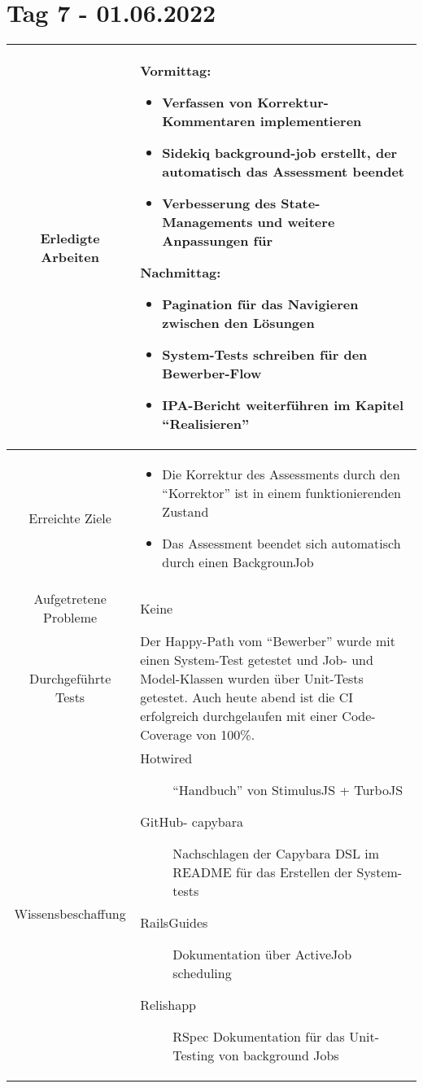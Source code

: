 \section{Tag 7 - 01.06.2022}

\begin{tabularx}{\textwidth}[H]{|c|X|}
    \hline
    Erledigte Arbeiten         &
    \textbf{Vormittag:}
    \begin{itemize}
        \item Verfassen von Korrektur-Kommentaren implementieren
        \item Sidekiq background-job erstellt, der automatisch das Assessment beendet
        \item Verbesserung des State-Managements und weitere Anpassungen für
    \end{itemize}
    \textbf{Nachmittag:}
    \begin{itemize}
        \item Pagination für das Navigieren zwischen den Lösungen
        \item System-Tests schreiben für den Bewerber-Flow
        \item IPA-Bericht weiterführen im Kapitel \enquote{Realisieren}
    \end{itemize}
    \\ \hline

    Erreichte Ziele            &
    \begin{itemize}
        \item Die Korrektur des Assessments durch den \enquote{Korrektor} ist in einem funktionierenden Zustand
        \item Das Assessment beendet sich automatisch durch einen BackgrounJob
    \end{itemize}
    \\ \hline

    Aufgetretene Probleme      &
    Keine
    \\ \hline

    Durchgeführte Tests        &
    Der Happy-Path vom \enquote{Bewerber} wurde mit einen System-Test getestet und Job- und Model-Klassen wurden über Unit-Tests getestet.
    Auch heute abend ist die CI erfolgreich durchgelaufen mit einer Code-Coverage von 100\%.
    \\ \hline

    Wissensbeschaffung         &
    \begin{description}
        \item[Hotwired] \enquote{Handbuch} von StimulusJS + TurboJS
        \item[GitHub- capybara] Nachschlagen der Capybara DSL im README für das Erstellen der System-tests
        \item[RailsGuides] Dokumentation über ActiveJob scheduling
        \item[Relishapp] RSpec Dokumentation für das Unit-Testing von background Jobs
    \end{description}
    \\ \hline


\end{tabularx}
